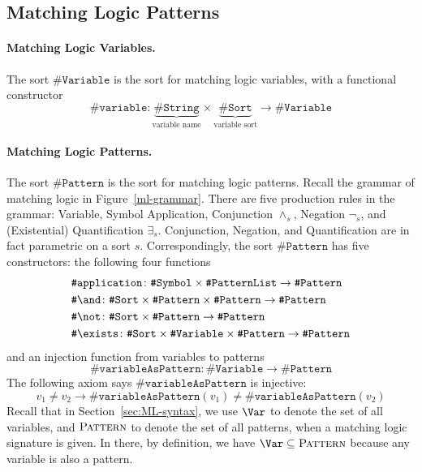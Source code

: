\documentclass[UTF8,11pt]{article}
\theoremstyle{plain}
\theoremstyle{definition}
\theoremstyle{remark}
\newcommand{\sharpsymbol}{\#}
\newcommand{\KString}{\texttt{\sharpsymbol String}}
\newcommand{\KSort}{\texttt{\sharpsymbol Sort}}
\newcommand{\KSymbol}{\texttt{\sharpsymbol Symbol}}
\newcommand{\KPatternList}{\texttt{\sharpsymbol PatternList}}
\newcommand{\KVariable}{\texttt{\sharpsymbol Variable}}
\newcommand{\KVariableAsKPattern}{\texttt{\sharpsymbol variableAsPattern}}
\newcommand{\KPattern}{\texttt{\sharpsymbol Pattern}}
\newcommand{\Kvariable}{\texttt{\sharpsymbol variable}}
\newcommand{\Kand}{\texttt{\sharpsymbol  \slashsymbol and}}
\newcommand{\Knot}{\texttt{\sharpsymbol  \slashsymbol not}}
\newcommand{\Kapplication}{\texttt{\sharpsymbol application}}
\newcommand{\Kexists}{\texttt{\sharpsymbol \slashsymbol  exists}}
\newcommand{\Pattern}{\textsc{Pattern}\xspace}
\newcommand{\slashsymbol}{\symbol{92}}
\begin{document}
\subsection{Matching Logic Patterns}
\label{sec:ML-patterns}

\paragraph{Matching Logic Variables.}
The sort $\KVariable$ is the sort for
matching logic variables, with a functional constructor
\begin{equation*}
  \Kvariable \colon \underbrace{\KString}_\text{variable name} \times
  \underbrace{\KSort}_\text{variable sort} \to \KVariable
\end{equation*}

\paragraph{Matching Logic Patterns.}
The sort $\KPattern$ is the sort for matching logic patterns.
Recall the grammar of matching logic in Figure~\ref{ml-grammar}.
There are five production rules in the grammar: Variable, Symbol Application,
Conjunction $\wedge_s$, Negation $\neg_s$, and (Existential) Quantification
$\exists_s$.
Conjunction, Negation, and Quantification are in fact
parametric on a sort $s$.
Correspondingly, the sort $\KPattern$ has five constructors:
the following four functions
\begin{align*}
  & \Kapplication \colon \KSymbol \times \KPatternList \to \KPattern
  \\
  & \Kand \colon \KSort \times \KPattern \times \KPattern \to \KPattern
  \\
  & \Knot \colon \KSort \times \KPattern \to \KPattern
  \\
  & \Kexists \colon \KSort \times \KVariable \times \KPattern \to \KPattern
\end{align*}
and an injection function from variables to patterns
\begin{equation*}
  \KVariableAsKPattern \colon \KVariable \to \KPattern
\end{equation*}
The following axiom says $\KVariableAsKPattern$ is injective:
$$
v_1 \neq v_2 \to \KVariableAsKPattern(v_1) \neq \KVariableAsKPattern(v_2)
$$
Recall that in Section~\ref{sec:ML-syntax}, we use $\Var$ to denote the set of all variables, and $\Pattern$ to denote the set of all patterns, when a matching logic signature is given.
In there, by definition, we have $\Var \subseteq \Pattern$ because any variable is also a pattern.
\end{document}
